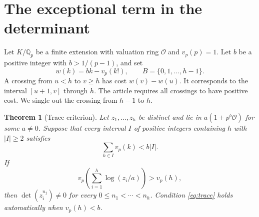 \documentclass[11pt]{article}
\newtheorem{theorem}{Theorem}[section]
\newcommand{\Q}{\mathbb Q}
\newcommand{\OO}{\mathcal O}
\begin{document}
\section{The exceptional term in the determinant}
Let $K/\Q_p$ be a finite extension with valuation ring $\OO$ and $v_p(p)=1$.
Let $b$ be a positive integer with $b>1/(p-1)$, and set
\[
 w(k)=bk-v_p(k!),\qquad B=\{0,1,\ldots,h-1\}.
\]
A crossing from $u<h$ to $v\ge h$ has cost $w(v)-w(u)$. It corresponds to the interval $[u+1,v]$ through $h$. The article requires all crossings to have positive cost. We single out the crossing from $h-1$ to $h$.

\begin{theorem}[Trace criterion]\label{thm:local}
Let $z_1,\ldots,z_h$ be distinct and lie in $a(1+p^b\OO)$ for some $a\ne0$. Suppose that every interval $I$ of positive integers containing $h$ with $|I|\ge2$ satisfies
\begin{equation}\label{eq:window}
 \sum_{k\in I} v_p(k)<b|I|.
\end{equation}
If
\begin{equation}\label{eq:trace}
 v_p\!\left(\sum_{i=1}^{h}\log(z_i/a)\right)>v_p(h),
\end{equation}
then $\det(z_i^{n_j})\ne0$ for every $0\le n_1<\cdots<n_h$.
Condition \eqref{eq:trace} holds automatically when $v_p(h)<b$.
\end{theorem}
\end{document}
